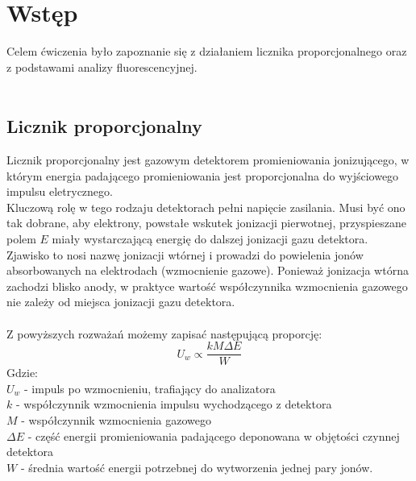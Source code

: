 \documentclass{article}
\begin{document}
\section{Wstęp}
Celem ćwiczenia było zapoznanie się z działaniem licznika proporcjonalnego oraz z podstawami analizy fluorescencyjnej.\\\\

\subsection{Licznik proporcjonalny}
Licznik proporcjonalny jest gazowym detektorem promieniowania jonizującego, w którym energia padającego promieniowania jest proporcjonalna do wyjściowego impulsu eletrycznego.\\
 Kluczową rolę w tego rodzaju detektorach pełni napięcie zasilania. Musi być ono tak dobrane, aby elektrony, powstałe wskutek jonizacji pierwotnej, przyspieszane polem $E$ miały wystarczającą energię do dalszej jonizacji gazu detektora. Zjawisko to nosi nazwę jonizacji wtórnej i prowadzi do powielenia jonów absorbowanych na elektrodach (wzmocnienie gazowe). Ponieważ jonizacja wtórna zachodzi blisko anody, w praktyce wartość współczynnika wzmocnienia gazowego nie zależy od miejsca jonizacji gazu detektora.\\\\
 Z powyższych rozważań możemy zapisać następującą proporcję:
 \begin{equation}
 U_{w} \propto  \frac{kM\Delta E}{W}
 \label{wz_U_w}
 \end{equation}
Gdzie:\\
$U_w$ - impuls po wzmocnieniu, trafiający do analizatora\\
$k$ - współczynnik wzmocnienia impulsu wychodzącego z detektora\\
$M$ - współczynnik wzmocnienia gazowego\\
$\Delta E$ - część energii promieniowania padającego deponowana w objętości czynnej detektora\\
$W$ - średnia wartość energii potrzebnej do wytworzenia jednej pary jonów.\\\\
\end{document}
